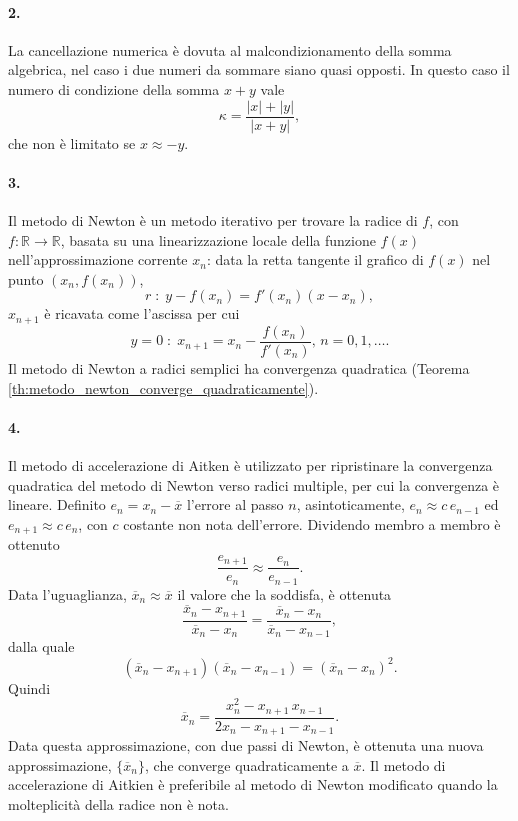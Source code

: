\paragraph{2.}
La cancellazione numerica è dovuta al malcondizionamento della somma algebrica, nel caso i due numeri da sommare siano quasi opposti. In questo caso il numero di condizione della somma $x+y$ vale
\begin{equation*}
    \kappa=\frac{|x|+|y|}{|x+y|},
\end{equation*}
che non è limitato se $x\approx -y$.

\paragraph{3.} Il metodo di Newton è un metodo iterativo per trovare la radice di $f$, con $f:\mathbb R\rightarrow\mathbb R$, basata su una linearizzazione locale della funzione $f(x)$ nell'approssimazione corrente $x_n$: data la retta tangente il grafico di $f(x)$ nel punto $(x_n, f(x_n))$, 
\begin{equation*}
    r\;:\;y-f(x_n)=f'(x_n)(x-x_n),
\end{equation*}
$x_{n+1}$ è ricavata come l'ascissa per cui
\begin{equation*}
    y=0\;:\;x_{n+1}=x_n-\frac{f(x_n)}{f'(x_n)},\, n=0,1,\hdots.
\end{equation*}
Il metodo di Newton a radici semplici ha convergenza quadratica (Teorema \ref{th:metodo_newton_converge_quadraticamente}).

\paragraph{4.}
Il metodo di accelerazione di Aitken è utilizzato per ripristinare la convergenza quadratica del metodo di Newton verso radici multiple, per cui la convergenza è lineare. Definito $e_n=x_n-\overline{x}$ l'errore al passo $n$, asintoticamente, $e_n\approx c \, e_{n-1}$ ed $e_{n+1}\approx c\, e_n$, con $c$ costante non nota dell'errore. Dividendo membro a membro è ottenuto
\begin{equation*}
    \frac{e_{n+1}}{e_n}\approx\frac{e_n}{e_{n-1}}.
\end{equation*}
Data  l'uguaglianza, $\overline x_n\approx \overline x$ il valore che la soddisfa, è ottenuta
\begin{equation*}
    \frac{\overline x_n - x_{n+1}}{\overline x_n - x_n} =\frac{\overline x_n - x_n}{\overline x_n - x_{n-1}},
\end{equation*}
dalla quale 
\begin{equation*}
    (\overline x_n-x_{n+1})(\overline x_n - x_{n-1})=(\overline x_n - x_n)^2.
\end{equation*}
Quindi
\begin{equation*}
    \overline x_n = \frac{x^2_n-x_{n+1}\,x_{n-1}}{2x_n - x_{n+1} - x_{n-1}}.
\end{equation*}
Data questa approssimazione, con due passi di Newton, è ottenuta una nuova approssimazione, $\{\overline x_n\}$, che converge quadraticamente a $\overline x$. Il metodo di accelerazione di Aitkien è preferibile al metodo di Newton modificato quando la molteplicità della radice non è nota.

